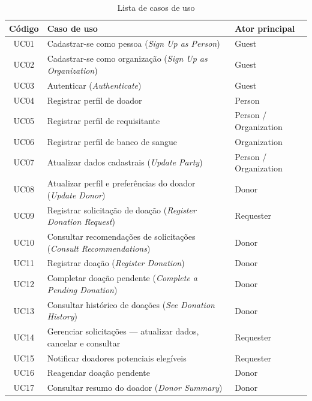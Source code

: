 \begin{table}[H]
  \centering
  \caption{Lista de casos de uso}
  \label{tab:uc}
  \small
  \begin{tabularx}{\textwidth}{c >{\raggedright\arraybackslash}X >{\raggedright\arraybackslash}p{3.2cm}}
    \toprule
    \textbf{Código} & \textbf{Caso de uso} & \textbf{Ator principal} \\
    \midrule
    UC01 & Cadastrar-se como pessoa (\textit{Sign Up as Person}) & Guest \\
    UC02 & Cadastrar-se como organização (\textit{Sign Up as Organization}) & Guest \\
    UC03 & Autenticar (\textit{Authenticate}) & Guest \\
    UC04 & Registrar perfil de doador & Person \\
    UC05 & Registrar perfil de requisitante & Person / Organization \\
    UC06 & Registrar perfil de banco de sangue & Organization \\
    UC07 & Atualizar dados cadastrais (\textit{Update Party}) & Person / Organization \\
    UC08 & Atualizar perfil e preferências do doador (\textit{Update Donor}) & Donor \\
    UC09 & Registrar solicitação de doação (\textit{Register Donation Request}) & Requester \\
    UC10 & Consultar recomendações de solicitações (\textit{Consult Recommendations}) & Donor \\
    UC11 & Registrar doação (\textit{Register Donation}) & Donor \\
    UC12 & Completar doação pendente (\textit{Complete a Pending Donation}) & Donor \\
    UC13 & Consultar histórico de doações (\textit{See Donation History}) & Donor \\
    UC14 & Gerenciar solicitações --- atualizar dados, cancelar e consultar & Requester \\
    UC15 & Notificar doadores potenciais elegíveis & Requester \\
    UC16 & Reagendar doação pendente & Donor \\
    UC17 & Consultar resumo do doador (\textit{Donor Summary}) & Donor \\
    \bottomrule
  \end{tabularx}
\end{table}

